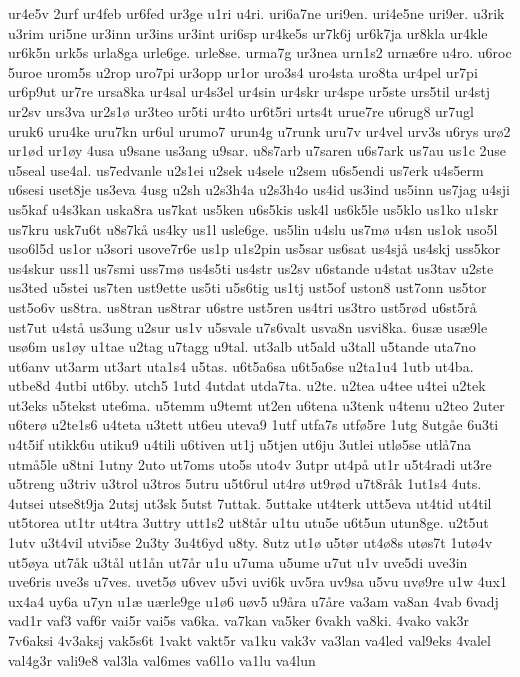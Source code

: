 {ur4e5v
2urf
ur4feb
ur6fed
ur3ge
u1ri
u4ri.
uri6a7ne
uri9en.
uri4e5ne
uri9er.
u3rik
u3rim
uri5ne
ur3inn
ur3ins
ur3int
uri6sp
ur4ke5s
ur7k6j
ur6k7ja
ur8kla
ur4kle
ur6k5n
urk5s
urla8ga
urle6ge.
urle8se.
urma7g
ur3nea
urn1s2
urnæ6re
u4ro.
u6roc
5uroe
urom5s
u2rop
uro7pi
ur3opp
ur1or
uro3s4
uro4sta
uro8ta
ur4pel
ur7pi
ur6p9ut
ur7re
ursa8ka
ur4sal
ur4s3el
ur4sin
ur4skr
ur4spe
ur5ste
urs5til
ur4stj
ur2sv
urs3va
ur2s1ø
ur3teo
ur5ti
ur4to
ur6t5ri
urts4t
urue7re
u6rug8
ur7ugl
uruk6
uru4ke
uru7kn
ur6ul
urumo7
urun4g
u7runk
uru7v
ur4vel
urv3s
u6rys
urø2
ur1ød
ur1øy
4usa
u9sane
us3ang
u9sar.
u8s7arb
u7saren
u6s7ark
us7au
us1c
2use
u5seal
use4al.
us7edvanle
u2s1ei
u2sek
u4sele
u2sem
u6s5endi
us7erk
u4s5erm
u6sesi
uset8je
us3eva
4usg
u2sh
u2s3h4a
u2s3h4o
us4id
us3ind
us5inn
us7jag
u4sji
us5kaf
u4s3kan
uska8ra
us7kat
us5ken
u6s5kis
usk4l
us6k5le
us5klo
us1ko
u1skr
us7kru
usk7u6t
u8s7kå
us4ky
us1l
usle6ge.
us5lin
u4slu
us7mø
u4sn
us1ok
uso5l
uso6l5d
us1or
u3sori
usove7r6e
us1p
u1s2pin
us5sar
us6sat
us4sjå
us4skj
uss5kor
us4skur
uss1l
us7smi
uss7mø
us4s5ti
us4str
us2sv
u6stande
u4stat
us3tav
u2ste
us3ted
u5stei
us7ten
ust9ette
us5ti
u5s6tig
us1tj
ust5of
uston8
ust7onn
us5tor
ust5o6v
us8tra.
us8tran
us8trar
u6stre
ust5ren
us4tri
us3tro
ust5rød
u6st5rå
ust7ut
u4stå
us3ung
u2sur
us1v
u5svale
u7s6valt
usva8n
usvi8ka.
6usæ
usæ9le
usø6m
us1øy
u1tae
u2tag
u7tagg
u9tal.
ut3alb
ut5ald
u3tall
u5tande
uta7no
ut6anv
ut3arm
ut3art
uta1s4
u5tas.
u6t5a6sa
u6t5a6se
u2ta1u4
1utb
ut4ba.
utbe8d
4utbi
ut6by.
utch5
1utd
4utdat
utda7ta.
u2te.
u2tea
u4tee
u4tei
u2tek
ut3eks
u5tekst
ute6ma.
u5temm
u9temt
ut2en
u6tena
u3tenk
u4tenu
u2teo
2uter
u6terø
u2te1s6
u4teta
u3tett
ut6eu
uteva9
1utf
utfa7s
utfø5re
1utg
8utgåe
6u3ti
u4t5if
utikk6u
utiku9
u4tili
u6tiven
ut1j
u5tjen
ut6ju
3utlei
utlø5se
utlå7na
utmå5le
u8tni
1utny
2uto
ut7oms
uto5s
uto4v
3utpr
ut4på
ut1r
u5t4radi
ut3re
u5treng
u3triv
u3trol
u3tros
5utru
u5t6rul
ut4rø
ut9rød
u7t8råk
1ut1s4
4uts.
4utsei
utse8t9ja
2utsj
ut3sk
5utst
7uttak.
5uttake
ut4terk
utt5eva
ut4tid
ut4til
ut5torea
ut1tr
ut4tra
3uttry
utt1s2
ut8tår
u1tu
utu5e
u6t5un
utun8ge.
u2t5ut
1utv
u3t4vil
utvi5se
2u3ty
3u4t6yd
u8ty.
8utz
ut1ø
u5tør
ut4ø8s
utøs7t
1utø4v
ut5øya
ut7åk
u3tål
ut1ån
ut7år
u1u
u7uma
u5ume
u7ut
u1v
uve5di
uve3in
uve6ris
uve3s
u7ves.
uvet5ø
u6vev
u5vi
uvi6k
uv5ra
uv9sa
u5vu
uvø9re
u1w
4ux1
ux4a4
uy6a
u7yn
u1æ
uærle9ge
u1ø6
uøv5
u9åra
u7åre
va3am
va8an
4vab
6vadj
vad1r
vaf3
vaf6r
vai5r
vai5s
va6ka.
va7kan
va5ker
6vakh
va8ki.
4vako
vak3r
7v6aksi
4v3aksj
vak5s6t
1vakt
vakt5r
va1ku
vak3v
va3lan
va4led
val9eks
4valel
val4g3r
vali9e8
val3la
val6mes
va6l1o
va1lu
va4lun
}
